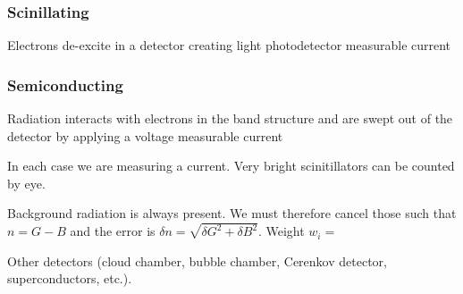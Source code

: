 \documentclass{article}
\begin{document}
\subsubsection{Scinillating}
Electrons de-excite in a detector creating light \rightarrow photodetector \rightarrow measurable current

\subsubsection{Semiconducting}
Radiation interacts with electrons in the band structure and are swept out of the detector by applying a voltage \rightarrow measurable current

In each case we are measuring a current. Very bright scinitillators can be counted by eye.

Background radiation is always present. We must therefore cancel those such that $n = G - B$ and the error is $\delta n = \sqrt{\delta G^2 + \delta B^2}$. Weight $w_i = $

Other detectors (cloud chamber, bubble chamber, Cerenkov detector, superconductors, etc.).
\end{document}
